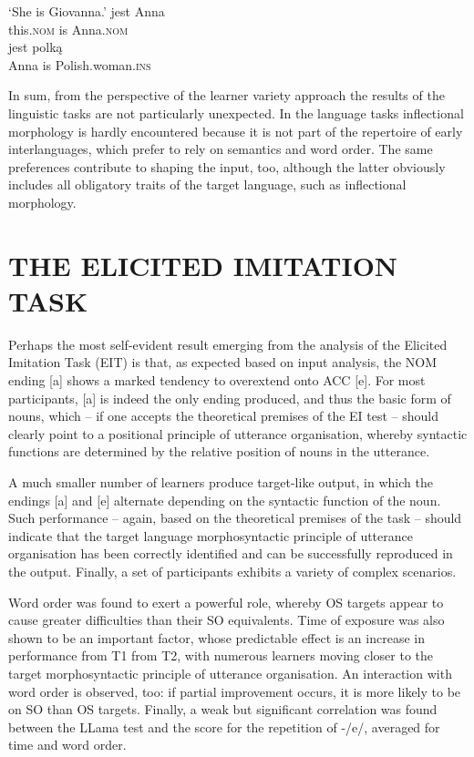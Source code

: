 \ea%
    \label{ex:08:8}
    \glt    ‘She is Giovanna.’
    \ex\label{ex:08:8b}
        {jest}  {Anna}\\
            this\textsc{.nom}  is  Anna\textsc{.nom}\\
    \ex\label{ex:08:8c}
      {jest}  {polką}\\
            Anna  is  Polish.woman\textsc{.ins}\\
    \z
\z

In sum, from the perspective of the learner variety approach the results of the linguistic tasks are not particularly unexpected. In the language tasks inflectional morphology is hardly encountered because it is not part of the repertoire of early interlanguages, which prefer to rely on semantics and word order. The same preferences contribute to shaping the input, too, although the latter obviously includes all obligatory traits of the target language, such as inflectional morphology. 

\section{THE ELICITED IMITATION TASK}\label{sec:08:2}

Perhaps the most self-evident result emerging from the analysis of the Elicited Imitation Task (EIT) is that, as expected based on input analysis, the NOM ending [a] shows a marked tendency to overextend onto ACC [e]. For most participants, [a] is indeed the only ending produced, and thus the basic form of nouns, which – if one accepts the theoretical premises of the EI test – should clearly point to a positional principle of utterance organisation, whereby syntactic functions are determined by the relative position of nouns in the utterance.

A much smaller number of learners produce target-like output, in which the endings [a] and [e] alternate depending on the syntactic function of the noun. Such performance – again, based on the theoretical premises of the task – should indicate that the target language morphosyntactic principle of utterance organisation has been correctly identified and can be successfully reproduced in the output. Finally, a set of participants exhibits a variety of complex scenarios. 

Word order was found to exert a powerful role, whereby OS targets appear to cause greater difficulties than their SO equivalents. Time of exposure was also shown to be an important factor, whose predictable effect is an increase in performance from T1 from T2, with numerous learners moving closer to the target morphosyntactic principle of utterance organisation. An interaction with word order is observed, too: if partial improvement occurs, it is more likely to be on SO than OS targets. Finally, a weak but significant correlation was found between the LLama test and the score for the repetition of -/e/, averaged for time and word order.

